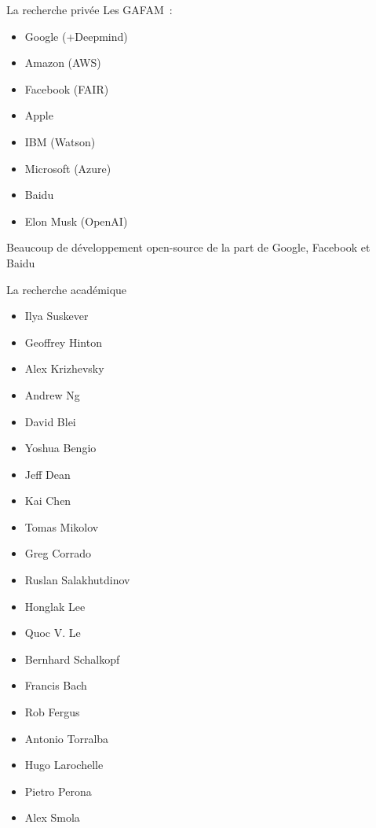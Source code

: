 \begin{frame}{La recherche privée}
  Les GAFAM~:

  \begin{itemize}
  \item Google (+Deepmind)
  \item Amazon (AWS)
  \item Facebook (FAIR)
  \item Apple 
  \item IBM (Watson)
  \item Microsoft (Azure)
  \item Baidu
  \item Elon Musk (OpenAI)
  \end{itemize}

  Beaucoup de développement open-source de la part de Google, Facebook et Baidu
\end{frame}

\begin{frame}{La recherche académique}
  \begin{minipage}{0.49\linewidth}   
    \begin{itemize}
      \item Ilya Suskever
      \item Geoffrey Hinton
      \item Alex Krizhevsky
      \item Andrew Ng
      \item David Blei
      \item Yoshua Bengio
      \item Jeff Dean
      \item Kai Chen
      \item Tomas Mikolov
      \item Greg Corrado
    \end{itemize}
  \end{minipage}
  \begin{minipage}{0.49\linewidth}
    \begin{itemize}
      \item Ruslan Salakhutdinov
      \item Honglak Lee
      \item Quoc V. Le
      \item Bernhard Schalkopf
      \item Francis Bach
      \item Rob Fergus
      \item Antonio Torralba
      \item Hugo Larochelle
      \item Pietro Perona
      \item Alex Smola
    \end{itemize}  
  \end{minipage}
\end{frame}

